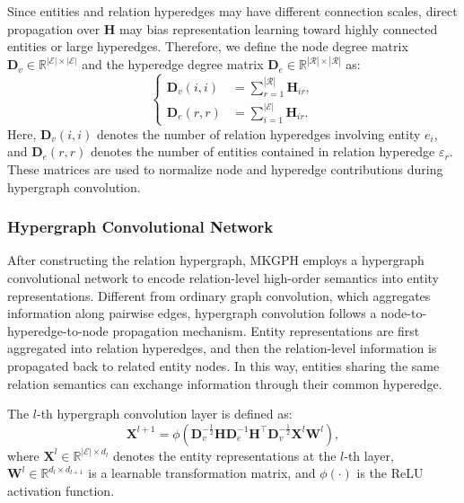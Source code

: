 \documentclass[a4paper,fleqn]{cas-sc}
\begin{document}
Since entities and relation hyperedges may have different connection scales, direct propagation over $\mathbf{H}$ may bias representation learning toward highly connected entities or large hyperedges. Therefore, we define the node degree matrix $\mathbf{D}_{v}\in\mathbb{R}^{|\mathcal{E}|\times|\mathcal{E}|}$ and the hyperedge degree matrix $\mathbf{D}_{e}\in\mathbb{R}^{|\mathcal{R}|\times|\mathcal{R}|}$ as:
\begin{equation}
\left\{
\begin{aligned}
\mathbf{D}_{v}(i,i) 
&= 
\sum_{r=1}^{|\mathcal{R}|}\mathbf{H}_{ir}, \\
\mathbf{D}_{e}(r,r) 
&= 
\sum_{i=1}^{|\mathcal{E}|}\mathbf{H}_{ir}.
\end{aligned}
\right.
\end{equation}
Here, $\mathbf{D}_{v}(i,i)$ denotes the number of relation hyperedges involving entity $e_i$, and $\mathbf{D}_{e}(r,r)$ denotes the number of entities contained in relation hyperedge $\varepsilon_r$. These matrices are used to normalize node and hyperedge contributions during hypergraph convolution.

\subsubsection{Hypergraph Convolutional Network}

After constructing the relation hypergraph, MKGPH employs a hypergraph convolutional network to encode relation-level high-order semantics into entity representations. Different from ordinary graph convolution, which aggregates information along pairwise edges, hypergraph convolution follows a node-to-hyperedge-to-node propagation mechanism. Entity representations are first aggregated into relation hyperedges, and then the relation-level information is propagated back to related entity nodes. In this way, entities sharing the same relation semantics can exchange information through their common hyperedge.

The $l$-th hypergraph convolution layer is defined as:
\begin{equation}
\mathbf{X}^{l+1}
=
\phi
\left(
\mathbf{D}_{v}^{-\frac{1}{2}}
\mathbf{H}
\mathbf{D}_{e}^{-1}
\mathbf{H}^{\top}
\mathbf{D}_{v}^{-\frac{1}{2}}
\mathbf{X}^{l}
\mathbf{W}^{l}
\right),
\end{equation}
where $\mathbf{X}^{l}\in\mathbb{R}^{|\mathcal{E}|\times d_l}$ denotes the entity representations at the $l$-th layer, $\mathbf{W}^{l}\in\mathbb{R}^{d_l\times d_{l+1}}$ is a learnable transformation matrix, and $\phi(\cdot)$ is the ReLU activation function.
\end{document}

